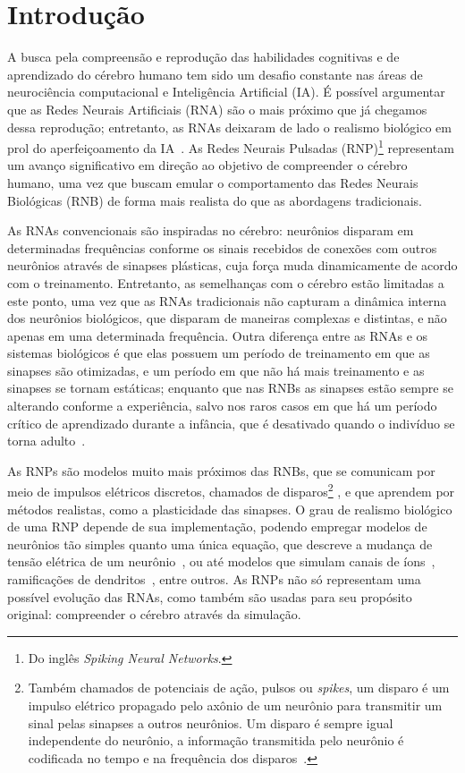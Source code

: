 \chapter{Introdução}

A busca pela compreensão e reprodução das habilidades cognitivas e de aprendizado do cérebro humano tem sido um desafio constante
nas áreas de neurociência computacional e Inteligência Artificial (IA). É possível argumentar que as Redes Neurais Artificiais
(RNA) são o mais próximo que já chegamos dessa reprodução; entretanto, as RNAs deixaram de lado o realismo biológico em prol do
aperfeiçoamento da IA~\cite{yamazakiSpiking2022}. As Redes Neurais Pulsadas (RNP)\footnote{Do inglês \textit{Spiking Neural
Networks}.} representam um avanço significativo em direção ao objetivo de compreender o cérebro humano, uma vez que buscam emular
o comportamento das Redes Neurais Biológicas (RNB) de forma mais realista do que as abordagens tradicionais.

As RNAs convencionais são inspiradas no cérebro: neurônios disparam em determinadas frequências conforme os sinais recebidos de
conexões com outros neurônios através de sinapses plásticas, cuja força muda dinamicamente de acordo com o treinamento.
Entretanto, as semelhanças com o cérebro estão limitadas a este ponto, uma vez que as RNAs tradicionais não capturam a dinâmica
interna dos neurônios biológicos, que disparam de maneiras complexas e distintas, e não apenas em uma determinada frequência.
Outra diferença entre as RNAs e os sistemas biológicos é que elas possuem um período de treinamento em que as sinapses são
otimizadas, e um período em que não há mais treinamento e as sinapses se tornam estáticas; enquanto que nas RNBs as sinapses estão
sempre se alterando conforme a experiência, salvo nos raros casos em que há um período crítico de aprendizado durante a infância,
que é desativado quando o indivíduo se torna adulto~\cite{crepelRegression1982}.

As RNPs são modelos muito mais próximos das RNBs, que se comunicam por meio de impulsos elétricos discretos, chamados de
disparos\footnote{Também chamados de potenciais de ação, pulsos ou \textit{spikes}, um disparo é um impulso elétrico propagado
pelo axônio de um neurônio para transmitir um sinal pelas sinapses a outros neurônios. Um disparo é sempre igual independente do
neurônio, a informação transmitida pelo neurônio é codificada no tempo e na frequência dos disparos~\cite{kandelPrinciples2021}.}
, e que aprendem por métodos realistas, como a plasticidade das sinapses. O grau de realismo biológico de uma RNP depende de sua
implementação, podendo empregar modelos de neurônios tão simples quanto uma única equação, que descreve a mudança de tensão
elétrica de um neurônio~\cite{burkittReview2006}, ou até modelos que simulam canais de íons~\cite{hodgkinQuantitative1952},
ramificações de dendritos~\cite{pagkalosIntroducing2023}, entre outros. As RNPs não só representam uma possível evolução das RNAs,
como também são usadas para seu propósito original: compreender o cérebro através da simulação.

